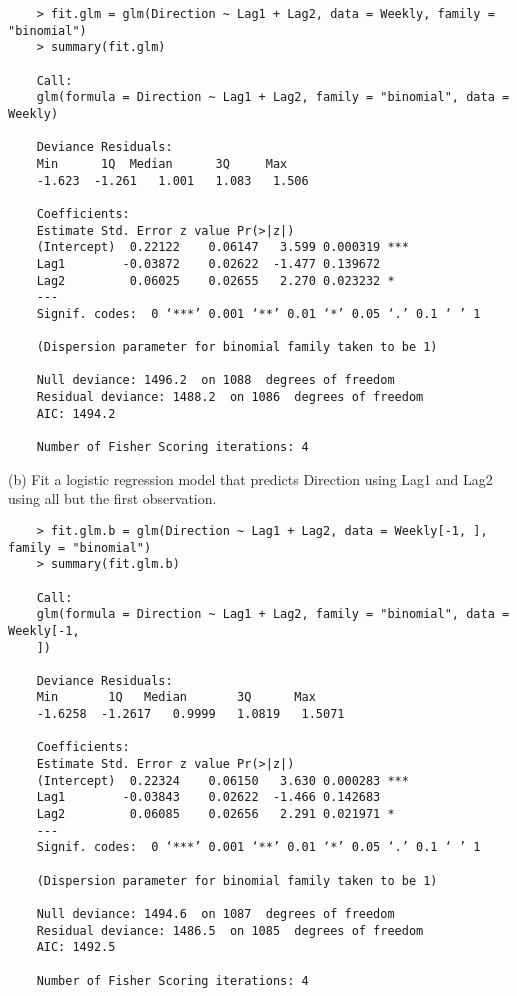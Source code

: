 \documentclass{article}
\begin{document}
\begin{program}
	\begin{verbatim}
	> fit.glm = glm(Direction ~ Lag1 + Lag2, data = Weekly, family = "binomial") 
	> summary(fit.glm)

	Call:
	glm(formula = Direction ~ Lag1 + Lag2, family = "binomial", data = Weekly)
	
	Deviance Residuals: 
	Min      1Q  Median      3Q     Max  
	-1.623  -1.261   1.001   1.083   1.506  
	
	Coefficients:
	Estimate Std. Error z value Pr(>|z|)    
	(Intercept)  0.22122    0.06147   3.599 0.000319 ***
	Lag1        -0.03872    0.02622  -1.477 0.139672    
	Lag2         0.06025    0.02655   2.270 0.023232 *  
	---
	Signif. codes:  0 ‘***’ 0.001 ‘**’ 0.01 ‘*’ 0.05 ‘.’ 0.1 ‘ ’ 1
	
	(Dispersion parameter for binomial family taken to be 1)
	
	Null deviance: 1496.2  on 1088  degrees of freedom
	Residual deviance: 1488.2  on 1086  degrees of freedom
	AIC: 1494.2
	
	Number of Fisher Scoring iterations: 4
	\end{verbatim}
\end{program}


\newpage
(b) Fit a logistic regression model that predicts Direction using Lag1 and Lag2 using all but the first observation.


\begin{program}
	\begin{verbatim}
	> fit.glm.b = glm(Direction ~ Lag1 + Lag2, data = Weekly[-1, ], family = "binomial")
	> summary(fit.glm.b)
	
	Call:
	glm(formula = Direction ~ Lag1 + Lag2, family = "binomial", data = Weekly[-1, 
	])
	
	Deviance Residuals: 
	Min       1Q   Median       3Q      Max  
	-1.6258  -1.2617   0.9999   1.0819   1.5071  
	
	Coefficients:
	Estimate Std. Error z value Pr(>|z|)    
	(Intercept)  0.22324    0.06150   3.630 0.000283 ***
	Lag1        -0.03843    0.02622  -1.466 0.142683    
	Lag2         0.06085    0.02656   2.291 0.021971 *  
	---
	Signif. codes:  0 ‘***’ 0.001 ‘**’ 0.01 ‘*’ 0.05 ‘.’ 0.1 ‘ ’ 1
	
	(Dispersion parameter for binomial family taken to be 1)
	
	Null deviance: 1494.6  on 1087  degrees of freedom
	Residual deviance: 1486.5  on 1085  degrees of freedom
	AIC: 1492.5
	
	Number of Fisher Scoring iterations: 4
	\end{verbatim}
\end{program}
\end{document}
